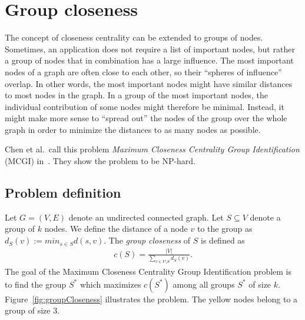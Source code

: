 \chapter{Group closeness}
\label{ch:groupCloseness}

The concept of closeness centrality can be extended to groups of nodes. Sometimes, an application does not require a list of important nodes, but rather a group of nodes that in combination has a large influence. The most important nodes of a graph are often close to each other, so their ``spheres of influence'' overlap. In other words, the most important nodes might have similar distances to most nodes in the graph. In a group of the most important nodes, the individual contribution of some nodes might therefore be minimal. Instead, it might make more sense to ``spread out'' the nodes of the group over the whole graph in order to minimize the distances to as many nodes as possible.

Chen et al.\ call this problem \emph{Maximum Closeness Centrality Group Identification} (MCGI) in~\cite{Chen2016}. They show the problem to be NP-hard.

\section{Problem definition}

Let $G = (V, E)$ denote an undirected connected graph. Let $S \subseteq V$ denote a group of $k$ nodes. We define the distance of a node $v$ to the group as $d_S(v) := min_{s \in S}d(s, v)$. The \emph{group closeness} of $S$ is defined as
\begin{align}
	c(S) = \frac{|V|}{\sum_{v \in V \setminus S}{d_S(v)}}.
\end{align}
The goal of the Maximum Closeness Centrality Group Identification problem is to find the group $S^*$ which maximizes $c(S^*)$ among all groups $S^*$ of size $k$.
Figure~\ref{fig:groupCloseness} illustrates the problem. The yellow nodes belong to a group of size $3$.

